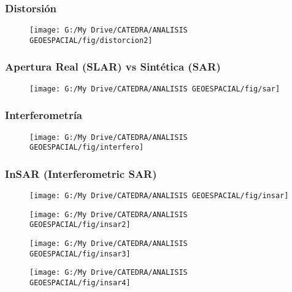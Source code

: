 \documentclass[14pt]{beamer}
\begin{document}
\begin{frame}
\frametitle{Distorsión}
 \begin{figure}
    \centering
    \texttt{[image: G:/My Drive/CATEDRA/ANALISIS GEOESPACIAL/fig/distorcion2]}
  \end{figure}
\end{frame}
\begin{frame}
\frametitle{Apertura Real (SLAR) vs Sintética (SAR)}
 \begin{figure}
    \centering
    \texttt{[image: G:/My Drive/CATEDRA/ANALISIS GEOESPACIAL/fig/sar]}
  \end{figure}
\end{frame}
\begin{frame}
\frametitle{Interferometría}
 \begin{figure}
    \centering
    \texttt{[image: G:/My Drive/CATEDRA/ANALISIS GEOESPACIAL/fig/interfero]}
  \end{figure}
\end{frame}
\begin{frame}
\frametitle{InSAR (Interferometric SAR)
}
 \begin{figure}
    \centering
    \texttt{[image: G:/My Drive/CATEDRA/ANALISIS GEOESPACIAL/fig/insar]}
  \end{figure}
\end{frame}
\begin{frame}
 \begin{figure}
    \centering
    \texttt{[image: G:/My Drive/CATEDRA/ANALISIS GEOESPACIAL/fig/insar2]}
  \end{figure}
\end{frame}
\begin{frame}
 \begin{figure}
    \centering
    \texttt{[image: G:/My Drive/CATEDRA/ANALISIS GEOESPACIAL/fig/insar3]}
  \end{figure}
\end{frame}
\begin{frame}
 \begin{figure}
    \centering
    \texttt{[image: G:/My Drive/CATEDRA/ANALISIS GEOESPACIAL/fig/insar4]}
  \end{figure}
\end{frame}
\end{document}
